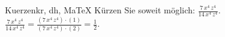 \begin{MAufgabe}{Kuerzen}{kr, dh, MaTeX}
K\"urzen Sie soweit m\"oglich: $\frac{7\, x^4\, z^4}{14\, x^4\, z^4}$.\\ 
\ifLsg\MLoesung
\quad $\frac{7\, x^4\, z^4}{14\, x^4\, z^4}=\frac{(7\, x^4\, z^4)\cdot(1)}{(7\, x^4\, z^4)\cdot(2)}=\frac{1}{2}$.\else\relax\fi
 \end{MAufgabe}